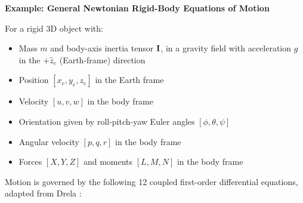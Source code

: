 \begin{example}
    \textbf{Example: General Newtonian Rigid-Body Equations of Motion}

    \noindent For a rigid 3D object with:
    \begin{itemize}[noitemsep]
        \item Mass $m$ and body-axis inertia tensor $\mathbf{I}$, in a gravity field with acceleration $g$ in the $+\hat{z}_e$ (Earth-frame) direction
        \item Position $[x_e, y_e, z_e]$ in the Earth frame
        \item Velocity $[u, v, w]$ in the body frame
        \item Orientation given by roll-pitch-yaw Euler angles $[\phi, \theta, \psi]$
        \item Angular velocity $[p, q, r]$ in the body frame
        \item Forces $[X, Y, Z]$ and moments $[L, M, N]$ in the body frame
    \end{itemize}

    \noindent Motion is governed by the following 12 coupled first-order differential equations, adapted from Drela \cite{drela_flight_2013}:


\end{example}
